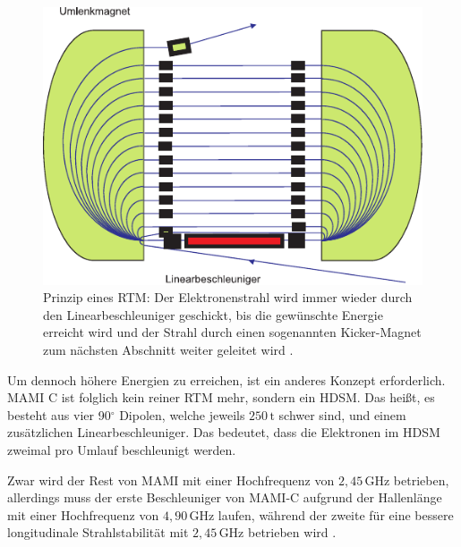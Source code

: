 \documentclass[a4paper,11pt,oneside,final,german,openbib,pdftex]{scrbook}
\begin{document}
{\begin{figure}[h!]
	\begin{center}
	\includegraphics{RTM}	
	\caption[Prinzip eines RTM]{Prinzip eines RTM: Der Elektronenstrahl wird immer wieder durch den Linearbeschleuniger geschickt, bis die gew\"unschte Energie erreicht wird und der Strahl durch einen sogenannten Kicker-Magnet zum nächsten Abschnitt weiter geleitet wird \cite{KPh07}. }
	\label{fig.RTM}
\end{center}
\end{figure}

Um dennoch höhere Energien zu erreichen, ist ein anderes Konzept erforderlich. MAMI C ist folglich kein reiner RTM mehr, sondern ein HDSM. Das hei{\ss}t, es besteht aus vier 90$^{\circ}$ Dipolen, welche jeweils $250\, \text{t}$ schwer sind, und einem zus\"atzlichen Linearbeschleuniger. 
Das bedeutet, dass die Elektronen im HDSM zweimal pro Umlauf beschleunigt werden.

Zwar wird der Rest von MAMI mit einer Hochfrequenz von $2,45\, \text{GHz}$ betrieben, allerdings muss der erste Beschleuniger von MAMI-C aufgrund der Hallenl\"ange mit einer Hochfrequenz von $4,90\, \text{GHz}$ laufen, w\"ahrend der zweite f\"ur eine bessere longitudinale Strahlstabilit\"at mit $2,45 \, \text{GHz}$ betrieben wird \cite{Ca10}.

\begin{table}[h!]
\centering



\end{table}}
\end{document}
